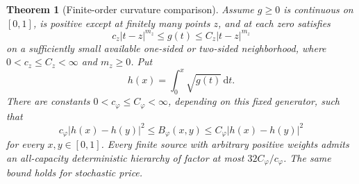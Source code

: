 \documentclass[11pt]{article}
\newtheorem{theorem}{Theorem}[section]
\theoremstyle{definition}\newtheorem{definition}[theorem]{Definition}
\theoremstyle{remark}\newtheorem{remark}[theorem]{Remark}
\newcommand{\ph}{\varphi}
\newcommand{\B}{B_{\ph}}
\newcommand{\rd}{\,\mathrm d}
\begin{document}
\begin{theorem}[Finite-order curvature comparison]
\label{thm:finiteorder}
Assume $g\ge0$ is continuous on $[0,1]$, is positive except at finitely many points $z$, and at each zero satisfies
\begin{equation}
c_z|t-z|^{m_z}\le g(t)\le C_z|t-z|^{m_z}
\label{eq:finiteorder}
\end{equation}
on a sufficiently small available one-sided or two-sided neighborhood, where $0<c_z\le C_z<\infty$ and $m_z\ge0$. Put
\[
h(x)=\int_0^x\sqrt{g(t)}\rd t.
\]
There are constants $0<c_\ph\le C_\ph<\infty$, depending on this fixed generator, such that
\begin{equation}
c_\ph|h(x)-h(y)|^2\le\B(x,y)\le C_\ph|h(x)-h(y)|^2
\label{eq:hcompare}
\end{equation}
for every $x,y\in[0,1]$. Every finite source with arbitrary positive weights admits an all-capacity deterministic hierarchy of factor at most $32C_\ph/c_\ph$. The same bound holds for stochastic price.
\end{theorem}
\end{document}
